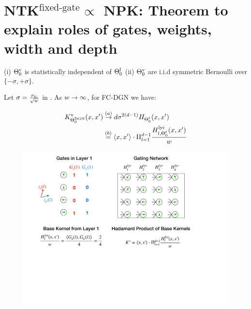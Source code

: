 \section{NTK$^{\text{fixed-gate}}\propto$ NPK: Theorem to explain roles of gates, weights, width and depth}

\begin{assumption}\label{assmp:main}
(i) ${\Theta}^{\text{v}}_0$ is statistically independent of $\Theta^{\textrm{f}}_0$ (ii) ${\Theta}^{\text{v}}_0$ are i.i.d symmetric Bernoulli over $\{-{\sigma},+{\sigma}\}$. 
\end{assumption}

\begin{theorem}\label{th:main} Let $\sigma=\frac{\sigma_{\text{fc}}}{\sqrt{w}}$ in . As $w\rightarrow\infty$, for FC-DGN we have: 

\begin{align*}
K^{\text{v}}_{\Theta^{\text{DGN}}_0}(x,x')&\stackrel{(a)}{\rightarrow} d \sigma^{2(d-1)} H_{\Theta^{\textrm{f}}_0}(x,x')\\ 
&\stackrel{(b)}= \langle x,x'\rangle\cdot \Pi_{l=1}^{d-1} \frac{H^{\text{lyr}}_{l,\Theta^{\textrm{f}}_0}(x,x')}{w}
\end{align*}

\end{theorem}

\FloatBarrier
\begin{figure}[h]
\centering
\includegraphics[scale=0.25]{figs/overall.pdf}
\end{figure}